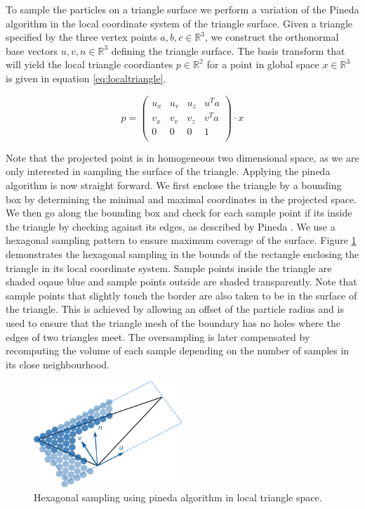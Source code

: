 \documentclass[11pt, letterpaper, twocolumn]{article}
\begin{document}
To sample the particles on a triangle surface we perform a variation of the Pineda algorithm \cite{pineda1988} in the local coordinate system of the triangle surface. Given a triangle specified by the three vertex points \(a, b, c \in \mathbb{R}^3\), we construct the orthonormal base vectors \(u,v,n \in \mathbb{R}^3\) defining the triangle surface. The basis transform that will yield the local triangle coordiantes \(p \in \mathbb{R^2}\) for a point in global space \(x \in \mathbb{R}^3\) is given in equation \ref{eq:localtriangle}.

\begin{equation}
  p = 
  \begin{pmatrix}
    u_x & u_v & u_z & u^T a\\
    v_x & v_v & v_z & v^T a\\
    0 & 0 & 0 & 1 \\
  \end{pmatrix}
  \cdot x 
\label{eq:localtriangle}
\end{equation}

Note that the projected point is in homogeneous two dimensional space, as we are only interested in sampling the surface of the triangle. Applying the pineda algorithm is now straight forward. We first enclose the triangle by a bounding box by determining the minimal and maximal coordinates in the projected space. We then go along the bounding box and check for each sample point if its inside the triangle by checking against its edges, as described by Pineda \cite{pineda1988}. We use a hexagonal sampling pattern to ensure maximum coverage of the surface. Figure \ref{fig:trianglesampling} demonstrates the hexagonal sampling in the bounds of the rectangle enclosing the triangle in its local coordinate system. Sample points inside the triangle are shaded oqaue blue and sample points outside are shaded transparently. Note that sample points that slightly touch the border are also taken to be in the surface of the triangle. This is achieved by allowing an offset of the particle radius and is used to ensure that the triangle mesh of the boundary has no holes where the edges of two triangles meet. The oversampling is later compensated by recomputing the volume of each sample depending on the number of samples in its close neighbourhood.

\begin{figure}[ht]
    \centering
    \includegraphics[width=0.5\textwidth]{images/triangle.pdf}
    \caption{Hexagonal sampling using pineda algorithm in local triangle space.}
    \label{fig:trianglesampling}
\end{figure}
\end{document}
